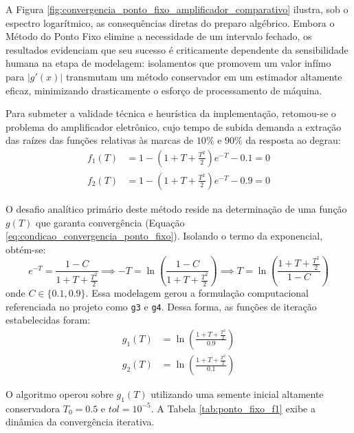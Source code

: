 A Figura \ref{fig:convergencia_ponto_fixo_amplificador_comparativo} ilustra, sob o espectro logarítmico, as consequências diretas do preparo algébrico. Embora o Método do Ponto Fixo elimine a necessidade de um intervalo fechado, os resultados evidenciam que seu sucesso é criticamente dependente da sensibilidade humana na etapa de modelagem: isolamentos que promovem um valor infímo para $|g'(x)|$ transmutam um método conservador em um estimador altamente eficaz, minimizando drasticamente o esforço de processamento de máquina.\label{subsubsec:problema_teste_1_ponto_fixo_alt}

Para submeter a validade técnica e heurística da implementação, retomou-se o problema do amplificador eletrônico, cujo tempo de subida demanda a extração das raízes das funções relativas às marcas de $10\%$ e $90\%$ da resposta ao degrau:
\begin{align}
    f_1(T) &= 1 - \left(1 + T + \frac{T^2}{2}\right)e^{-T} - 0.1 = 0 \label{eq:f1_ponto_fixo_alt} \\
    f_2(T) &= 1 - \left(1 + T + \frac{T^2}{2}\right)e^{-T} - 0.9 = 0 \label{eq:f2_ponto_fixo_alt}
\end{align}

O desafio analítico primário deste método reside na determinação de uma função $g(T)$ que garanta convergência (Equação \ref{eq:condicao_convergencia_ponto_fixo}). Isolando o termo da exponencial, obtém-se:
\begin{equation}
    e^{-T} = \frac{1 - C}{1 + T + \frac{T^2}{2}} \implies -T = \ln\left(\frac{1 - C}{1 + T + \frac{T^2}{2}}\right) \implies T = \ln\left(\frac{1 + T + \frac{T^2}{2}}{1 - C}\right)
\end{equation}
onde $C \in \{0.1, 0.9\}$. Essa modelagem gerou a formulação computacional referenciada no projeto como \texttt{g3} e \texttt{g4}. Dessa forma, as funções de iteração estabelecidas foram:
\begin{align}
    g_1(T) &= \ln\left(\frac{1 + T + \frac{T^2}{2}}{0.9}\right) \label{eq:g1_ponto_fixo} \\
    g_2(T) &= \ln\left(\frac{1 + T + \frac{T^2}{2}}{0.1}\right) \label{eq:g2_ponto_fixo}
\end{align}

O algoritmo operou sobre $g_1(T)$ utilizando uma semente inicial altamente conservadora $T_0 = 0.5$ e $tol = 10^{-5}$. A Tabela \ref{tab:ponto_fixo_f1} exibe a dinâmica da convergência iterativa.

